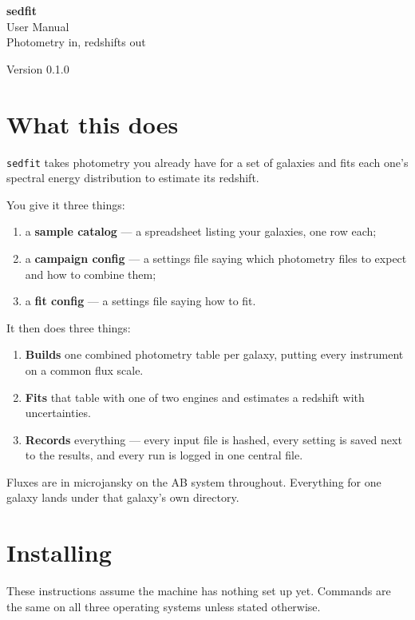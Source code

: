 \documentclass[11pt]{article}
\newcommand{\manualname}{sedfit}
\newcommand{\manualtagline}{Photometry in, redshifts out}
\newcommand{\manualversion}{0.1.0}
\newcommand{\manualtitlepage}{%
  \thispagestyle{empty}
  \vspace*{4cm}
  \begin{center}
    {\Huge\bfseries\manualname}\\[0.7cm]
    {\Large User Manual}\\[1.3cm]
    {\normalsize\manualtagline}
  \end{center}
  \vfill
  \begin{center}\normalsize Version \manualversion\end{center}
  \newpage
  \tableofcontents
  \newpage
}
\begin{document}
\manualtitlepage

\section{What this does}

\texttt{sedfit} takes photometry you already have for a set of galaxies
and fits each one's spectral energy distribution to estimate its
redshift.

You give it three things:

\begin{enumerate}
  \item a \textbf{sample catalog} --- a spreadsheet listing your
        galaxies, one row each;
  \item a \textbf{campaign config} --- a settings file saying which
        photometry files to expect and how to combine them;
  \item a \textbf{fit config} --- a settings file saying how to fit.
\end{enumerate}

It then does three things:

\begin{enumerate}
  \item \textbf{Builds} one combined photometry table per galaxy, putting
        every instrument on a common flux scale.
  \item \textbf{Fits} that table with one of two engines and estimates a
        redshift with uncertainties.
  \item \textbf{Records} everything --- every input file is hashed, every
        setting is saved next to the results, and every run is logged in
        one central file.
\end{enumerate}

Fluxes are in microjansky on the AB system throughout. Everything for one
galaxy lands under that galaxy's own directory.

\section{Installing}

These instructions assume the machine has nothing set up yet. Commands
are the same on all three operating systems unless stated otherwise.
\end{document}
